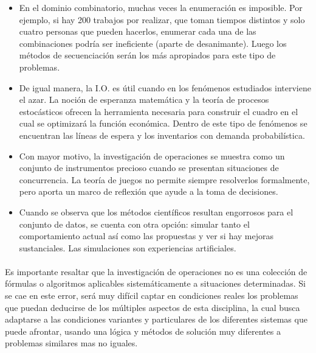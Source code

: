 \documentclass[12pt, a4paper,spanish]{article}
\begin{document}
		\begin{itemize}

			\item En el dominio combinatorio, muchas veces la enumeración es imposible. Por ejemplo, si hay 200 trabajos por realizar, que toman tiempos distintos y solo cuatro personas que pueden hacerlos, enumerar cada una de las combinaciones podría ser ineficiente (aparte de desanimante). Luego los métodos de secuenciación serán los más apropiados para este tipo de problemas.\cite{wikipedia_IO}

			\item De igual manera, la I.O. es útil cuando en los fenómenos estudiados interviene el azar. La noción de esperanza matemática y la teoría de procesos estocásticos ofrecen la herramienta necesaria para construir el cuadro en el cual se optimizará la función económica. Dentro de este tipo de fenómenos se encuentran las líneas de espera y los inventarios con demanda probabilística.\cite{wikipedia_IO}

			\item Con mayor motivo, la investigación de operaciones se muestra como un conjunto de instrumentos precioso cuando se presentan situaciones de concurrencia. La teoría de juegos no permite siempre resolverlos formalmente, pero aporta un marco de reflexión que ayude a la toma de decisiones.\cite{wikipedia_IO}

			\item Cuando se observa que los métodos científicos resultan engorrosos para el conjunto de datos, se cuenta con otra opción: simular tanto el comportamiento actual así como las propuestas y ver si hay mejoras sustanciales. Las simulaciones son experiencias artificiales.\cite{wikipedia_IO}

		\end{itemize}

		\paragraph{}
		Es importante resaltar que la investigación de operaciones no es una colección de fórmulas o algoritmos aplicables sistemáticamente a situaciones determinadas. Si se cae en este error, será muy difícil captar en condiciones reales los problemas que puedan deducirse de los múltiples aspectos de esta disciplina, la cual busca adaptarse a las condiciones variantes y particulares de los diferentes sistemas que puede afrontar, usando una lógica y métodos de solución muy diferentes a problemas similares mas no iguales.\cite{wikipedia_IO}
\end{document}
